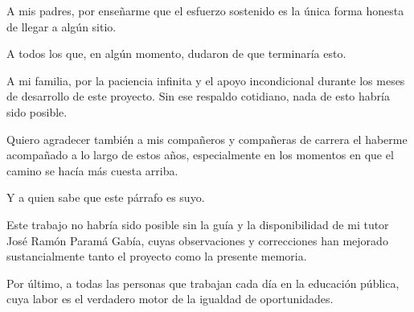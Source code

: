 \documentclass[11pt,a4paper,titlepage,oneside]{report}
\begin{document}

 
 A mis padres, por enseñarme que el esfuerzo sostenido es la única forma honesta de llegar a algún sitio.

 A todos los que, en algún momento, dudaron de que terminaría esto.
 \begin{agradecementos}
 A mi familia, por la paciencia infinita y el apoyo incondicional durante los meses de desarrollo de este proyecto. Sin ese respaldo cotidiano, nada de esto habría sido posible.
 
 Quiero agradecer también a mis compañeros y compañeras de carrera el haberme acompañado a lo largo de estos años, especialmente en los momentos en que el camino se hacía más cuesta arriba.
 
 Y a quien sabe que este párrafo es suyo.
 
 Este trabajo no habría sido posible sin la guía y la disponibilidad de mi tutor José Ramón Paramá Gabía, cuyas observaciones y correcciones han mejorado sustancialmente tanto el proyecto como la presente memoria.
 
 Por último, a todas las personas que trabajan cada día en la educación pública, cuya labor es el verdadero motor de la igualdad de oportunidades.
 \end{agradecementos}
 

 \setcounter{page}{1}

 \tableofcontents
 \listoffigures
 \listoftables
 \clearpage
 
 \setcounter{page}{1}


 
 
 
 
 
 
 
 


 \appendix
 \appendixpage
 
%


 
 
 \clearpage
 
\end{document}
